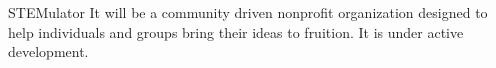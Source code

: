 STEMulator
It will be a community driven nonprofit organization designed to help individuals and groups bring their ideas to fruition.
It is under active development.
